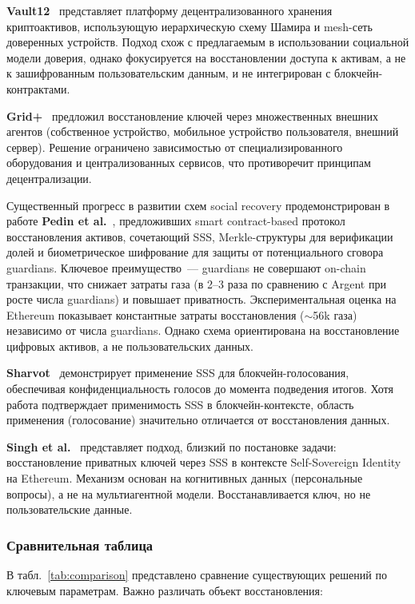 \documentclass[12pt]{a&t}
\begin{document}
\textbf{Vault12}~\cite{vault12} представляет платформу децентрализованного хранения криптоактивов, использующую иерархическую схему Шамира и mesh-сеть доверенных устройств. Подход схож с предлагаемым в использовании социальной модели доверия, однако фокусируется на восстановлении доступа к активам, а не к зашифрованным пользовательским данным, и не интегрирован с блокчейн-контрактами.

\textbf{Grid+}~\cite{gridplus} предложил восстановление ключей через множественных внешних агентов (собственное устройство, мобильное устройство пользователя, внешний сервер). Решение ограничено зависимостью от специализированного оборудования и централизованных сервисов, что противоречит принципам децентрализации.

Существенный прогресс в развитии схем social recovery продемонстрирован в работе \textbf{Pedin et al.}~\cite{pedin2023}, предложивших smart contract-based протокол восстановления активов, сочетающий SSS, Merkle-структуры для верификации долей и биометрическое шифрование для защиты от потенциального сговора guardians. Ключевое преимущество~--- guardians не совершают on-chain транзакции, что снижает затраты газа (в 2--3 раза по сравнению с Argent при росте числа guardians) и повышает приватность. Экспериментальная оценка на Ethereum показывает константные затраты восстановления ($\sim$56k газа) независимо от числа guardians. Однако схема ориентирована на восстановление цифровых активов, а не пользовательских данных.

\textbf{Sharvot}~\cite{sharvot} демонстрирует применение SSS для блокчейн-голосования, обеспечивая конфиденциальность голосов до момента подведения итогов. Хотя работа подтверждает применимость SSS в блокчейн-контексте, область применения (голосование) значительно отличается от восстановления данных.

\textbf{Singh et al.}~\cite{singh2021} представляет подход, близкий по постановке задачи: восстановление приватных ключей через SSS в контексте Self-Sovereign Identity на Ethereum. Механизм основан на когнитивных данных (персональные вопросы), а не на мультиагентной модели. Восстанавливается ключ, но не пользовательские данные.

\subsubsection{Сравнительная таблица}

В табл.~\ref{tab:comparison} представлено сравнение существующих решений по ключевым параметрам. Важно различать объект восстановления:
\end{document}
